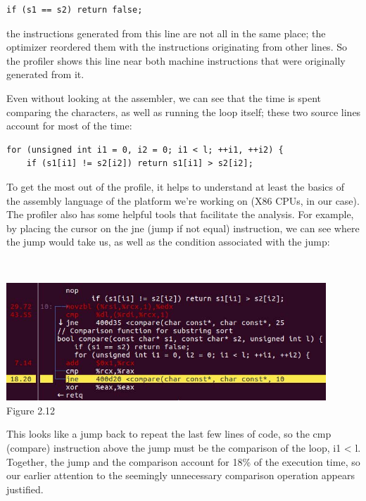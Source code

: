 \begin{lstlisting}[style=styleCXX]
if (s1 == s2) return false;
\end{lstlisting}

the instructions generated from this line are not all in the same place; the optimizer reordered them with the instructions originating from other lines. So the profiler shows this line near both machine instructions that were originally generated from it.

Even without looking at the assembler, we can see that the time is spent comparing the characters, as well as running the loop itself; these two source lines account for most of the time:

\begin{lstlisting}[style=styleCXX]
for (unsigned int i1 = 0, i2 = 0; i1 < l; ++i1, ++i2) {
	if (s1[i1] != s2[i2]) return s1[i1] > s2[i2];
\end{lstlisting}

To get the most out of the profile, it helps to understand at least the basics of the assembly language of the platform we're working on (X86 CPUs, in our case). The profiler also has some helpful tools that facilitate the analysis. For example, by placing the cursor on the jne (jump if not equal) instruction, we can see where the jump would take us, as well as the condition associated with the jump:

\hspace*{\fill} \\ %
\begin{center}
\includegraphics[width=0.9\textwidth]{content/1/chapter2/images/12.jpg}\\
Figure 2.12
\end{center}

This looks like a jump back to repeat the last few lines of code, so the cmp (compare) instruction above the jump must be the comparison of the loop, i1 < l. Together, the jump and the comparison account for 18\% of the execution time, so our earlier attention to the seemingly unnecessary comparison operation appears justified.

